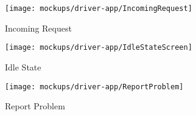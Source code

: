 \newpage
\vfill
\begin{figure*}[h!t]
    \centering
    \begin{subfigure}[h!t]{0.25\paperwidth}
            \texttt{[image: mockups/driver-app/IncomingRequest]}
            \caption{Incoming Request}
    \end{subfigure}
    \hspace{0.05\paperwidth}
    \begin{subfigure}[h!t]{0.25\paperwidth}
            \texttt{[image: mockups/driver-app/IdleStateScreen]}
            \caption{Idle State}
    \end{subfigure}
    \vspace{0.05\paperwidth}

    \begin{subfigure}[h!t]{0.25\paperwidth}
            \texttt{[image: mockups/driver-app/ReportProblem]}
            \caption{Report Problem}
    \end{subfigure}

\end{figure*}
\vfill
\clearpage


